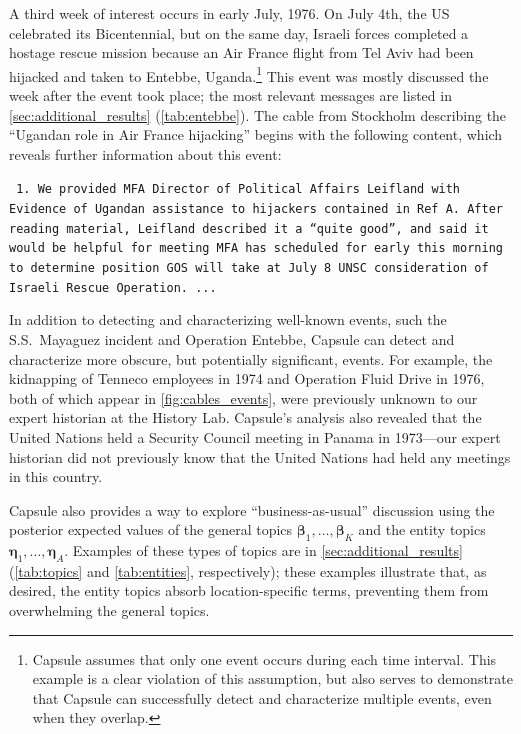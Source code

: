 A third week of interest occurs in early July, 1976.  On July 4th, the
US celebrated its Bicentennial, but on the same day, Israeli forces
completed a hostage rescue mission because an Air France flight from
Tel Aviv had been hijacked and taken to Entebbe,
Uganda.\footnote{Capsule assumes that only one event occurs during
  each time interval. This example is a clear violation of this
  assumption, but also serves to demonstrate that Capsule can
  successfully detect and characterize multiple events, even when they
  overlap.} This event was mostly discussed the week after the event
took place; the most relevant messages are listed in
\cref{sec:additional_results} (\cref{tab:entebbe}). The cable from
Stockholm describing the ``Ugandan role in Air France hijacking''
begins with the following content, which reveals further information
about this event:
\begin{shaded*} \tt{
1. We provided MFA Director of Political Affairs
Leifland with Evidence of Ugandan assistance to
hijackers contained in Ref A.  After reading material,{}
Leifland described it a ``quite good'', and said it{}
would be helpful for meeting MFA has scheduled for
early this morning to determine position GOS will take
at July 8 UNSC consideration of Israeli Rescue Operation. ...
}
\end{shaded*}

In addition to detecting and characterizing well-known events, such
the S.S.~Mayaguez incident and Operation Entebbe, Capsule can detect
and characterize more obscure, but potentially significant,
events. For example, the kidnapping of Tenneco employees in 1974 and
Operation Fluid Drive in 1976, both of which appear in
\cref{fig:cables_events}, were previously unknown to our expert
historian at the History Lab. Capsule's analysis also revealed that
the United Nations held a Security Council meeting in Panama in
1973---our expert historian did not previously know that the United
Nations had held any meetings in this country.

Capsule also provides a way to explore ``business-as-usual''
discussion using the posterior expected values of the general topics
$\mathbold{\beta}_1, \ldots, \mathbold{\beta}_K$ and the entity topics
$\mathbold{\eta}_1, \ldots, \mathbold{\eta}_A$. Examples of these
types of topics are in \cref{sec:additional_results}
(\cref{tab:topics} and \cref{tab:entities}, respectively); these
examples illustrate that, as desired, the entity topics absorb
location-specific terms, preventing them from overwhelming the general
topics.

